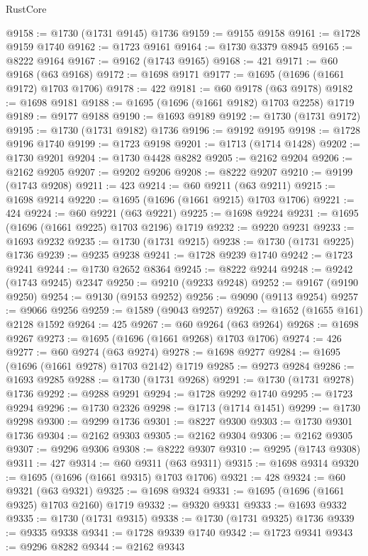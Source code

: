 \begin{lexlean}{RustCore}
\begin{coremodule}
@9158 := @1730 (@1731 @9145) @1736
@9159 := @9155 @9158
@9161 := @1728 @9159 @1740
@9162 := @1723 @9161
@9164 := @1730 @3379 @8945
@9165 := @8222 @9164
@9167 := @9162 (@1743 @9165)
@9168 := 421
@9171 := @60 @9168 (@63 @9168)
@9172 := @1698 @9171
@9177 := @1695 (@1696 (@1661 @9172) @1703 @1706)
@9178 := 422
@9181 := @60 @9178 (@63 @9178)
@9182 := @1698 @9181
@9188 := @1695 (@1696 (@1661 @9182) @1703 @2258) @1719
@9189 := @9177 @9188
@9190 := @1693 @9189
@9192 := @1730 (@1731 @9172)
@9195 := @1730 (@1731 @9182) @1736
@9196 := @9192 @9195
@9198 := @1728 @9196 @1740
@9199 := @1723 @9198
@9201 := @1713 (@1714 @1428)
@9202 := @1730 @9201
@9204 := @1730 @4428 @8282
@9205 := @2162 @9204
@9206 := @2162 @9205
@9207 := @9202 @9206
@9208 := @8222 @9207
@9210 := @9199 (@1743 @9208)
@9211 := 423
@9214 := @60 @9211 (@63 @9211)
@9215 := @1698 @9214
@9220 := @1695 (@1696 (@1661 @9215) @1703 @1706)
@9221 := 424
@9224 := @60 @9221 (@63 @9221)
@9225 := @1698 @9224
@9231 := @1695 (@1696 (@1661 @9225) @1703 @2196) @1719
@9232 := @9220 @9231
@9233 := @1693 @9232
@9235 := @1730 (@1731 @9215)
@9238 := @1730 (@1731 @9225) @1736
@9239 := @9235 @9238
@9241 := @1728 @9239 @1740
@9242 := @1723 @9241
@9244 := @1730 @2652 @8364
@9245 := @8222 @9244
@9248 := @9242 (@1743 @9245) @2347
@9250 := @9210 (@9233 @9248)
@9252 := @9167 (@9190 @9250)
@9254 := @9130 (@9153 @9252)
@9256 := @9090 (@9113 @9254)
@9257 := @9066 @9256
@9259 := @1589 (@9043 @9257)
@9263 := @1652 (@1655 @161) @2128 @1592
@9264 := 425
@9267 := @60 @9264 (@63 @9264)
@9268 := @1698 @9267
@9273 := @1695 (@1696 (@1661 @9268) @1703 @1706)
@9274 := 426
@9277 := @60 @9274 (@63 @9274)
@9278 := @1698 @9277
@9284 := @1695 (@1696 (@1661 @9278) @1703 @2142) @1719
@9285 := @9273 @9284
@9286 := @1693 @9285
@9288 := @1730 (@1731 @9268)
@9291 := @1730 (@1731 @9278) @1736
@9292 := @9288 @9291
@9294 := @1728 @9292 @1740
@9295 := @1723 @9294
@9296 := @1730 @2326
@9298 := @1713 (@1714 @1451)
@9299 := @1730 @9298
@9300 := @9299 @1736
@9301 := @8227 @9300
@9303 := @1730 @9301 @1736
@9304 := @2162 @9303
@9305 := @2162 @9304
@9306 := @2162 @9305
@9307 := @9296 @9306
@9308 := @8222 @9307
@9310 := @9295 (@1743 @9308)
@9311 := 427
@9314 := @60 @9311 (@63 @9311)
@9315 := @1698 @9314
@9320 := @1695 (@1696 (@1661 @9315) @1703 @1706)
@9321 := 428
@9324 := @60 @9321 (@63 @9321)
@9325 := @1698 @9324
@9331 := @1695 (@1696 (@1661 @9325) @1703 @2160) @1719
@9332 := @9320 @9331
@9333 := @1693 @9332
@9335 := @1730 (@1731 @9315)
@9338 := @1730 (@1731 @9325) @1736
@9339 := @9335 @9338
@9341 := @1728 @9339 @1740
@9342 := @1723 @9341
@9343 := @9296 @8282
@9344 := @2162 @9343

\end{coremodule}
\end{lexlean}
